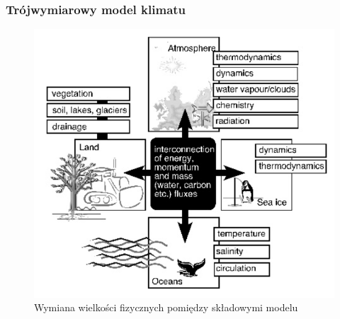 \documentclass{beamer}
\begin{document}
\begin{frame}
	\frametitle{Trójwymiarowy model klimatu}
			\begin{figure}[h]
			\begin{center}
				\includegraphics[width=0.6\linewidth]{images/Figure6.png}
				\caption{Wymiana wielkości fizycznych pomiędzy składowymi modelu}
			\end{center}
		\end{figure}
\end{frame}
\end{document}
